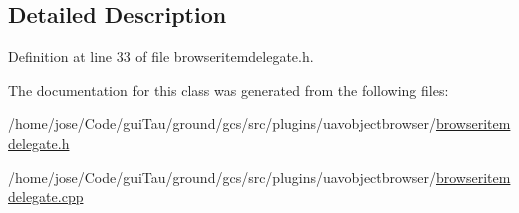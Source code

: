 \subsection{Detailed Description}


Definition at line 33 of file browseritemdelegate.\-h.



The documentation for this class was generated from the following files\-:\begin{DoxyCompactItemize}
\item 
/home/jose/\-Code/gui\-Tau/ground/gcs/src/plugins/uavobjectbrowser/\hyperlink{browseritemdelegate_8h}{browseritemdelegate.\-h}\item 
/home/jose/\-Code/gui\-Tau/ground/gcs/src/plugins/uavobjectbrowser/\hyperlink{browseritemdelegate_8cpp}{browseritemdelegate.\-cpp}\end{DoxyCompactItemize}
